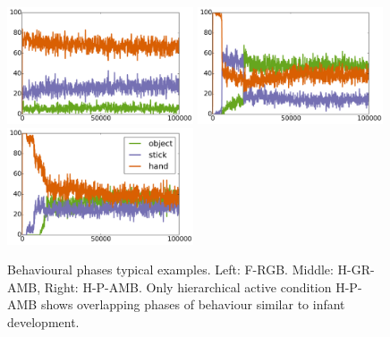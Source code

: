 \documentclass[10pt,letterpaper]{article}
\begin{document}
	\begin{figure}[t]
		\centering
		\includegraphics[width=5.5cm]{./include/F-RGB-log53-events-100000.pdf}
		\includegraphics[width=5.5cm]{./include/H-RGB-GR-AMB-log13-events-100000.pdf}
		\includegraphics[width=5.5cm]{./include/H-RGB-P-AMB-log38-events-100000.pdf}
		\caption{Behavioural phases typical examples. Left: F-RGB. Middle: H-GR-AMB, Right: H-P-AMB. Only hierarchical active condition H-P-AMB shows overlapping phases of behaviour similar to infant development.}
		\label{res_ow}
	\end{figure}
	
\end{document}
